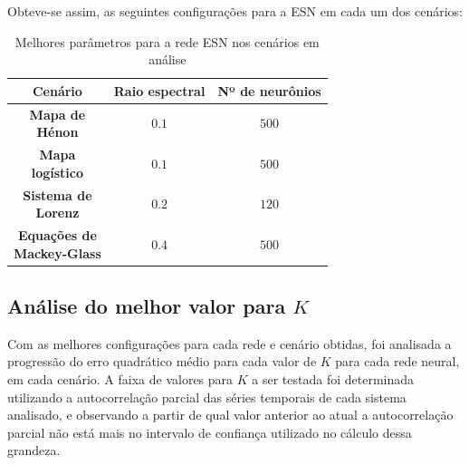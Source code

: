 \documentclass[9pt, technote]{article}
\begin{document}
Obteve-se assim, as seguintes configurações para a ESN em cada um dos cenários:
\begin{table}[!ht]
\begin{center}
\begin{tabular}{c c c}
  \textbf{Cenário} & {\centering \textbf{Raio espectral}} & {\centering \textbf{Nº de neurônios}}\\
 \hline
 \addlinespace
 \pbox{0.7cm}{\centering \textbf{Mapa de\newline Hénon}} & $0.1$ & $500$\\  
  \addlinespace
 \pbox{0.7cm}{\centering \textbf{Mapa\newline logístico}} & $0.1$ & $500$\\ 
  \addlinespace
 \pbox{0.9cm}{\centering \textbf{Sistema de\newline Lorenz}} & $0.2$ & $120$\\ 
  \addlinespace
 \pbox{0.929cm}{\centering \textbf{Equações de\newline Mackey-Glass}} & $0.4$ & $500$\\ 
\end{tabular}
\caption{Melhores parâmetros para a rede ESN nos cenários em análise}
\end{center}
\end{table}

\subsection{Análise do melhor valor para $K$}

Com as melhores configurações para cada rede e cenário obtidas, foi analisada a progressão do erro quadrático médio para cada valor de $K$ para cada rede neural, em cada cenário. A faixa de valores para $K$ a ser testada foi determinada utilizando a autocorrelação parcial das séries temporais de cada sistema analisado, e observando a partir de qual valor anterior ao atual a autocorrelação parcial não está mais no intervalo de confiança utilizado no cálculo dessa grandeza.
\end{document}

